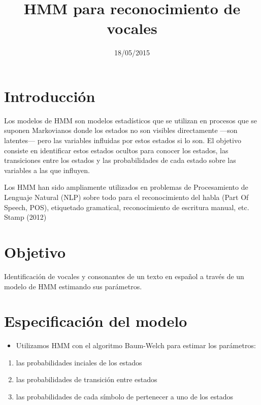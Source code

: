 \documentclass[]{article}
\title{HMM para reconocimiento de vocales}
\author{}
\date{18/05/2015}
\begin{document}
\maketitle


{
\hypersetup{linkcolor=black}
\setcounter{tocdepth}{2}
\tableofcontents
}
\pagebreak

\section{Introducción}\label{introduccion}

Los modelos de HMM son modelos estadísticos que se utilizan en procesos
que se suponen Markovianos donde los estados no son visibles
directamente ---son latentes--- pero las variables influidas por estos
estados si lo son. El objetivo consiste en identificar estos estados
ocultos para conocer los estados, las transiciones entre los estados y
las probabilidades de cada estado sobre las variables a las que
influyen.

Los HMM han sido ampliamente utilizados en problemas de Procesamiento de
Lenguaje Natural (NLP) sobre todo para el reconocimiento del habla (Part
Of Speech, POS), etiquetado gramatical, reconocimiento de escritura
manual, etc. Stamp (2012)

\section{Objetivo}\label{objetivo}

Identificación de vocales y consonantes de un texto en español a través
de un modelo de HMM estimando sus parámetros.

\section{Especificación del modelo}\label{especificacion-del-modelo}

\begin{itemize}
\itemsep1pt\parskip0pt
\item
  Utilizamos HMM con el algoritmo Baum-Welch para estimar los
  parámetros:
\end{itemize}

\begin{enumerate}
\def\labelenumi{\arabic{enumi}.}
\itemsep1pt\parskip0pt
\item
  las probabilidades inciales de los estados
\item
  las probabilidades de transición entre estados
\item
  las probabilidades de cada símbolo de pertenecer a uno de los estados
\end{enumerate}
\end{document}

